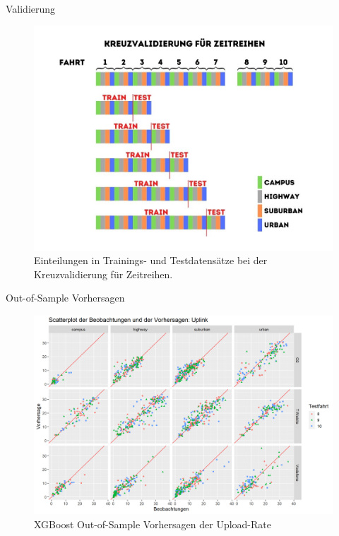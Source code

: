 \begin{frame}{Validierung}
	\begin{figure}[h]
		\centering
		\includegraphics[scale=0.33]{kreuzvalidierung}
		\caption{Einteilungen in Trainings- und Testdatensätze bei der Kreuzvalidierung für Zeitreihen.}
		\label{kreuzvalidierung}
	\end{figure}
\end{frame}

\begin{frame}{Out-of-Sample Vorhersagen}
    \begin{figure}[h]
        \centering
        \includegraphics[scale=0.33]{plots/xgboost/uplink/scatter_colored_axes_fixed}
        \caption{XGBoost Out-of-Sample Vorhersagen der Upload-Rate}
        \label{xgboost_scatter_colored_uplink}
    \end{figure}
\end{frame}


